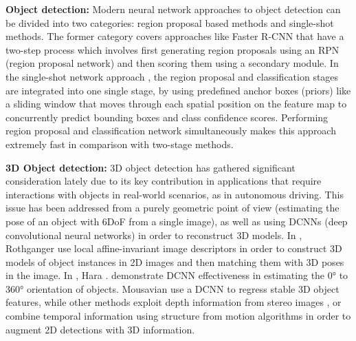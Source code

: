\documentclass[10pt,twocolumn,letterpaper]{article}
\begin{document}
\textbf{Object detection: } Modern neural network approaches to object detection can be divided into two categories: region proposal based methods and single-shot methods. The former category covers approaches like Faster R-CNN \cite{faster} that have a two-step process which involves first generating region proposals using an RPN (region proposal network) and then scoring them using a secondary module. In the single-shot network approach \cite{ssd}, the region proposal and classification stages are integrated into one single stage, by using predefined anchor boxes (priors) like a sliding window that moves through each spatial position on the feature map to concurrently predict bounding boxes and class confidence scores. Performing region proposal and classification network simultaneously makes this approach extremely fast in comparison with two-stage methods.

\textbf{3D Object detection: } 3D object detection has gathered significant consideration lately due to its key contribution in applications that require interactions with objects in real-world scenarios, as in autonomous driving.  This issue has been addressed from a purely geometric point of view (\eg estimating the pose of an object with 6DoF from a single image), as well as using DCNNs (deep convolutional neural networks) in order to reconstruct 3D models. In \cite{Rothganger}, Rothganger \etal  use local affine-invariant image descriptors in order to construct 3D models of object instances in 2D images and then matching them with 3D poses in the image. In \cite{Hara2017DesigningDC}, Hara \etal. demonstrate DCNN effectiveness in estimating the \ang{0} to \ang{360} orientation of objects. Mousavian \etal \cite{Mousavian} use a DCNN to regress stable 3D object features, while other methods exploit depth information from stereo images \cite{3DOP-stereo}, or combine temporal information using structure from motion algorithms in order to augment 2D detections with 3D information.

\end{document}
